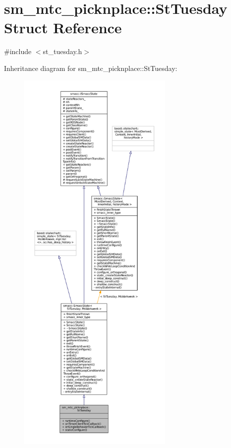 \hypertarget{structsm__mtc__picknplace_1_1StTuesday}{}\section{sm\+\_\+mtc\+\_\+picknplace\+:\+:St\+Tuesday Struct Reference}
\label{structsm__mtc__picknplace_1_1StTuesday}


{\ttfamily \#include $<$st\+\_\+tuesday.\+h$>$}



Inheritance diagram for sm\+\_\+mtc\+\_\+picknplace\+:\+:St\+Tuesday\+:
\nopagebreak
\begin{figure}[H]
\begin{center}
\leavevmode
\includegraphics[height=550pt]{structsm__mtc__picknplace_1_1StTuesday__inherit__graph}
\end{center}
\end{figure}


